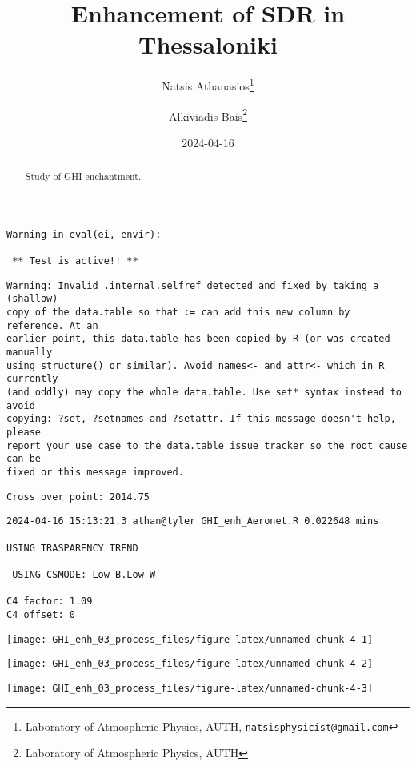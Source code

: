 \documentclass[
  10pt,
  a4paper,oneside]{article}
\title{Enhancement of SDR in Thessaloniki}
\author{Natsis Athanasios\footnote{Laboratory of Atmospheric Physics, AUTH, \href{mailto:natsisphysicist@gmail.com}{\nolinkurl{natsisphysicist@gmail.com}}} \and Alkiviadis Bais\footnote{Laboratory of Atmospheric Physics, AUTH}}
\date{2024-04-16}
\begin{document}
\maketitle
\begin{abstract}
Study of GHI enchantment.
\end{abstract}

{
\hypersetup{linkcolor=}
\setcounter{tocdepth}{4}
\tableofcontents
}
\begin{verbatim}
Warning in eval(ei, envir): 

 ** Test is active!! ** 
\end{verbatim}

\begin{verbatim}
Warning: Invalid .internal.selfref detected and fixed by taking a (shallow)
copy of the data.table so that := can add this new column by reference. At an
earlier point, this data.table has been copied by R (or was created manually
using structure() or similar). Avoid names<- and attr<- which in R currently
(and oddly) may copy the whole data.table. Use set* syntax instead to avoid
copying: ?set, ?setnames and ?setattr. If this message doesn't help, please
report your use case to the data.table issue tracker so the root cause can be
fixed or this message improved.
\end{verbatim}

\begin{verbatim}
Cross over point: 2014.75 
\end{verbatim}

\begin{verbatim}
2024-04-16 15:13:21.3 athan@tyler GHI_enh_Aeronet.R 0.022648 mins

USING TRASPARENCY TREND

 USING CSMODE: Low_B.Low_W 

C4 factor: 1.09 
C4 offset: 0 
\end{verbatim}

\begin{center}\texttt{[image: GHI\_enh\_03\_process\_files/figure-latex/unnamed-chunk-4-1]} \end{center}

\begin{center}\texttt{[image: GHI\_enh\_03\_process\_files/figure-latex/unnamed-chunk-4-2]} \end{center}

\begin{center}\texttt{[image: GHI\_enh\_03\_process\_files/figure-latex/unnamed-chunk-4-3]} \end{center}
\end{document}
